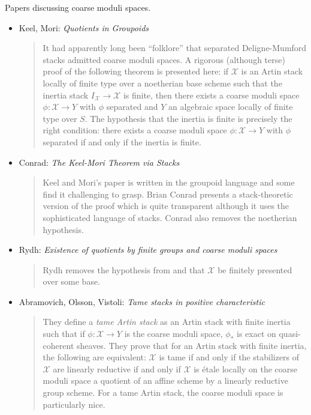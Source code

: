 \noindent
Papers discussing coarse moduli spaces.
\begin{itemize}
\item Keel, Mori: \emph{Quotients in Groupoids} \cite{K-M}
\begin{quote}
It had apparently long been ``folklore'' that separated Deligne-Mumford stacks
admitted coarse moduli spaces. A rigorous (although terse) proof of the
following theorem is presented here: if $\mathcal{X}$ is an Artin stack
locally of
finite type over a noetherian base scheme such that the inertia stack
$I_\mathcal{X} \to \mathcal{X}$ is finite, then there exists a coarse
moduli space $\phi : \mathcal{X} \to Y$
with $\phi$ separated and $Y$ an algebraic space locally of finite type over
$S$. The hypothesis that the inertia is finite is precisely the right
condition: there exists a coarse moduli space $\phi : \mathcal{X} \to Y$ with
$\phi$
separated if and only if the inertia is finite.
\end{quote}
\item Conrad: \emph{The Keel-Mori Theorem via Stacks} \cite{conrad}
\begin{quote}
Keel and Mori's paper \cite{K-M} is written in the groupoid language and
some find it challenging to grasp. Brian Conrad presents a stack-theoretic
version of the proof which is quite transparent although it uses the
sophisticated language of stacks. Conrad also removes the noetherian
hypothesis.
\end{quote}
\item Rydh: \emph{Existence of quotients by finite groups and coarse moduli
spaces} \cite{rydh_quotients}
\begin{quote}
Rydh removes the hypothesis from \cite{K-M} and \cite{conrad} that
$\mathcal{X}$
be finitely presented over some base.
\end{quote}
\item
Abramovich, Olsson, Vistoli: \emph{Tame stacks in positive characteristic}
\cite{tame}
\begin{quote}
They define a \emph{tame Artin stack} as an Artin stack with finite inertia
such that if $\phi : \mathcal{X} \to Y$ is the coarse moduli space,
$\phi_*$ is exact
on quasi-coherent sheaves. They prove that for an Artin stack with finite
inertia, the following are equivalent: $\mathcal{X}$ is tame if and only
if the stabilizers of $\mathcal{X}$ are linearly reductive
if and only if $\mathcal{X}$ is \'etale locally on the coarse
moduli space a quotient of an affine scheme by a linearly reductive group
scheme. For a tame Artin stack, the coarse moduli space is particularly nice.

\end{quote}
\end{itemize}
